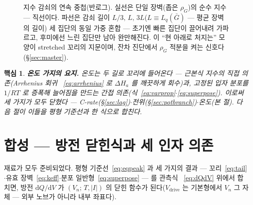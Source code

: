 \documentclass[11pt,a4paper]{article}
\newtheorem*{keybox}{핵심}
\newcommand{\dd}{\mathrm{d}}
\newcommand{\drive}{\mathrm{drive}}
\begin{document}
\begin{figure}[t]
\centering
{}
\caption{지수 감쇠의 연속 중첩(반로그). 실선은 단일 장벽(좁은 $\rho_G$)의 순수 지수 — 직선이다. 파선은
감쇠 길이 $L/3,\,L,\,3L$($L\equiv L_q(\bar G)$ — 평균 장벽의 길이) 세 집단의 동일 가중 혼합 —
초기엔 빠른 집단이 끌어내려 가파르고, 후미에선 느린 집단만 남아 완만해진다. 이 ``현 아래로 처지는'' 모양이 stretched 꼬리의 지문이며, 잔차 진단에서
$\rho_G$ 적분을 켜는 신호다(\S\ref{sec:master}).}
\label{fig:superpose}
\end{figure}

\begin{keybox}
\textbf{온도 가지의 요지.} 온도는 두 길로 꼬리에 들어온다 — 근본식 지수의 직접 의존(Arrhenius 회귀
~\eqref{eq:arrhenius} 로 $\Delta H_a$ 를 깨끗하게 회수)과, 고정된 입자 분포를 $1/RT$ 로 증폭해 늘어짐을
만드는 간접 의존(식~\eqref{eq:varprop}$\cdot$\eqref{eq:superpose}). 이로써 세 가지가 모두 닫혔다 —
C-rate(\S\ref{sec:lag})$\cdot$전위(\S\ref{sec:potbranch})$\cdot$온도(본 절). 다음 절이 이들을 평형
기준선과 한 식으로 합친다.
\end{keybox}

\section{합성 — 방전 닫힌식과 세 인자 의존}\label{sec:synth}
재료가 모두 준비되었다. 평형 기준선~\eqref{eq:eqpeak} 과 세 가지의 결과 — 꼬리~\eqref{eq:tail}
$\cdot$유효 장벽~\eqref{eq:keff}$\cdot$분포 일반형~\eqref{eq:superpose} — 를 관측식
~\eqref{eq:dQdV} 위에서 합치면, 방전 $\dd Q/\dd V$ 가 $(V_n;\,T,|I|)$ 의 닫힌 함수가
된다($V_\drive$ 는 기본형에서 $V_n$ 그 자체 — 외부 노브가 아니라 내부 좌표다).
\end{document}
